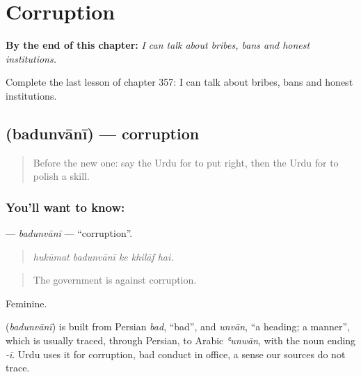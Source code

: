 
\chapter{Corruption}
\label{ch:ur-corruption}

\begin{chapteropening}
\textbf{By the end of this chapter:} \emph{I can talk about bribes, bans and honest institutions.}

Complete the last lesson of chapter 357: I can talk about bribes, bans and honest institutions.
\end{chapteropening}

\section[\texorpdfstring{\ur{بدعنوانی} (badunvānī)}{بدعنوانی (badunvānī)}]{ (badunvānī) — corruption}

\label{lesson:UR-C357-badunvani}



\begin{quote}
Before the new one: say the Urdu for to put right, then the Urdu for to polish a skill.
\end{quote}

\subsection*{You'll want to know: }
\textbf{} — \emph{badunvānī} — \textquotedblleft{}corruption\textquotedblright{}.

\begin{quote}
    
\end{quote}

\begin{quote}
\emph{hukūmat badunvānī ke khilāf hai.}
\end{quote}

\begin{quote}
The government is against corruption.
\end{quote}

Feminine.

\begin{cousinweb}
\textbf{} (\emph{badunvānī}) is built from Persian \emph{bad}, \textquotedblleft{}bad\textquotedblright{}, and \emph{unvān}, \textquotedblleft{}a heading; a manner\textquotedblright{}, which is usually traced, through Persian, to Arabic \emph{ʿunwān}, with the noun ending \emph{-ī}. Urdu uses it for corruption, bad conduct in office, a sense our sources do not trace.
\end{cousinweb}

